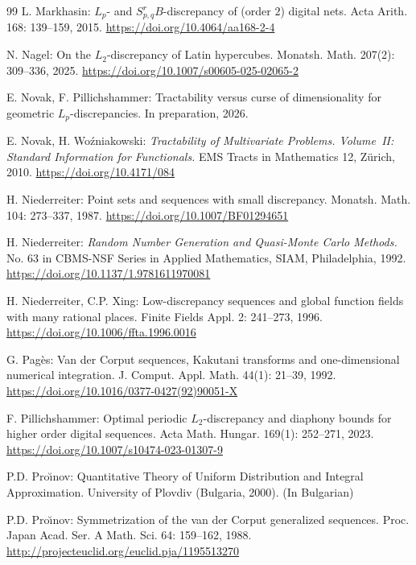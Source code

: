 \documentclass[12pt, a4paper]{article}
\begin{document}
\begin{thebibliography}{99}
 L. Markhasin: $L_p$- and $S_{p,q}^rB$-discrepancy of (order $2$) digital nets. Acta Arith. 168: 139--159, 2015. \href{https://doi.org/10.4064/aa168-2-4}{https://doi.org/10.4064/aa168-2-4}

 N. Nagel: On the $L_2$-discrepancy of Latin hypercubes. Monatsh. Math. 207(2): 309--336, 2025. \href{https://doi.org/10.1007/s00605-025-02065-2}{https://doi.org/10.1007/s00605-025-02065-2}

 E. Novak, F. Pillichshammer: Tractability versus curse of dimensionality for geometric $L_p$-discrepancies. In preparation, 2026.

 E. Novak, H. Wo\'{z}niakowski: {\em Tractability of Multivariate Problems. Volume~II: Standard Information for Functionals.} EMS Tracts in Mathematics 12, Z\"urich, 2010. \href{https://doi.org/10.4171/084}{https://doi.org/10.4171/084}

 H. Niederreiter: Point sets and sequences with small discrepancy. Monatsh. Math. 104: 273--337, 1987. \href{https://doi.org/10.1007/BF01294651}{https://doi.org/10.1007/BF01294651}

 H. Niederreiter: {\it Random Number Generation and Quasi-Monte Carlo Methods.} No. 63 in CBMS-NSF Series in Applied Mathematics, SIAM, Philadelphia, 1992. \href{https://doi.org/10.1137/1.9781611970081}{https://doi.org/10.1137/1.9781611970081}

 H. Niederreiter, C.P. Xing: Low-discrepancy sequences and global function fields with many rational places. Finite Fields Appl. 2: 241--273, 1996. \href{https://doi.org/10.1006/ffta.1996.0016}{https://doi.org/10.1006/ffta.1996.0016}

 G. Pag\`{e}s: Van der Corput sequences, Kakutani transforms and one-dimensional numerical integration. J. Comput. Appl. Math. 44(1): 21--39, 1992. \href{https://doi.org/10.1016/0377-0427(92)90051-X}{https://doi.org/10.1016/0377-0427(92)90051-X} 

 F. Pillichshammer: Optimal periodic $L_2$-discrepancy and diaphony bounds for higher order digital sequences. Acta Math. Hungar. 169(1): 252--271, 2023. \href{https://doi.org/10.1007/s10474-023-01307-9}{https://doi.org/10.1007/s10474-023-01307-9}


 P.D. Pro{\u\i}nov: Quantitative Theory of Uniform Distribution and Integral Approximation. University of Plovdiv (Bulgaria, 2000). (In Bulgarian)

 P.D. Pro{\u\i}nov: Symmetrization of the van der {C}orput generalized sequences. Proc. Japan Acad. Ser. A Math. Sci. 64: 159--162, 1988. \href{http://projecteuclid.org/euclid.pja/1195513270}{http://projecteuclid.org/euclid.pja/1195513270}


\end{thebibliography}
\end{document}

